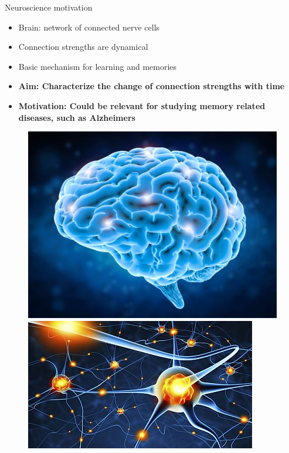 \documentclass[aspectratio=169]{beamer}
\begin{document}
	\begin{frame}{Neuroscience motivation}
		
		
		\begin{itemize}
			\item Brain: network of connected nerve cells
			\item Connection strengths are dynamical
			\item Basic mechanism for learning and memories
            \item \textbf{Aim: Characterize the change of connection strengths with time}
            \item \textbf{Motivation: Could be relevant for studying memory related diseases, such as Alzheimers}
        
        \end{itemize}
            
        \begin{figure}[H]
        \includegraphics[scale=0.4]{Brain.jpg}
        \includegraphics[scale=0.4]{Neurons.jpg}
        \vspace{-0.5cm}
        \end{figure}

		
	\end{frame}	
	
\end{document}
